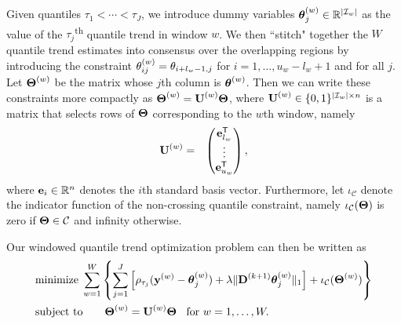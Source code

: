 \documentclass[aoas]{imsart}
\newcommand{\Real}{\mathbb{R}}
\newcommand{\Tra}{^{\sf T}} %
\newcommand{\V}[1]{{\bm{\mathbf{\MakeLowercase{#1}}}}} %
\newcommand{\VE}[2]{\MakeLowercase{#1}_{#2}} %
\newcommand{\Vn}[2]{\V{#1}^{(#2)}} %
\newcommand{\VnE}[3]{{#1}^{(#2)}_{#3}} %
\newcommand{\M}[1]{{\bm{\mathbf{\MakeUppercase{#1}}}}} %
\newcommand{\Mn}[2]{\M{#1}^{(#2)}} %
\begin{document}
%
Given quantiles $\tau_1 < \cdots < \tau_J$, we introduce dummy variables $\Vn{\theta}{w}_{j} \in \Real^{\lvert \mathcal{I}_w \rvert}$ as the value of the $\tau_j$\textsuperscript{th} quantile trend in window $w$. We then ``stitch" together the $W$ quantile trend estimates into consensus over the overlapping regions by introducing the constraint $\VnE{\theta}{w}{ij} = \VE{\theta}{i + l_w - 1,j}$ for $i = 1, \ldots, u_w - l_w + 1$ and for all $j$. Let $\Mn{\Theta}{w}$ be the matrix whose $j$th column is $\Vn{\theta}{w}$. Then we can write these constraints more compactly as $\Mn{\Theta}{w} = \Mn{U}{w}\M{\Theta}$, where $\Mn{U}{w} \in \{0, 1\}^{\lvert \mathcal{I}_w \rvert \times n}$ is a matrix that selects rows of $\M{\Theta}$ corresponding to the $w$th window, namely
\begin{eqnarray*}
	\Mn{U}{w} & = & \begin{pmatrix}
		\V{e}_{l_w}\Tra \\
		\vdots \\
		\V{e}_{u_w}\Tra
	\end{pmatrix},
\end{eqnarray*}
where $\V{e}_i \in \Real^{n}$ denotes the $i$th standard basis vector. Furthermore, let $\iota_{\mathcal{C}}$ denote the indicator function of the non-crossing quantile constraint, namely $\iota_{\mathcal{C}}(\M{\Theta})$ is zero if $\M{\Theta} \in \mathcal{C}$ and infinity otherwise.

Our windowed quantile trend optimization problem can then be written as
\begin{equation}
\label{eq:quantile_windows}
\begin{split}
&\text{minimize}\; \sum_{w=1}^W \left \{\sum_{j=1}^J \left [\rho_{\tau_j}(\Vn{y}{w} - \Vn{\theta}{w}_{j}) +
\lambda \lVert \Mn{D}{k+1} \Vn{\theta}{w}_{j} \rVert_1 \right ] + \iota_\mathcal{C}(\Mn{\Theta}{w}) \right\}\\
&\text{subject to} \qquad \Mn{\Theta}{w} = \Mn{U}{w}\M{\Theta} \;\; \text{ for } w = 1, \ldots, W.
\end{split}
\end{equation}
\end{document}
